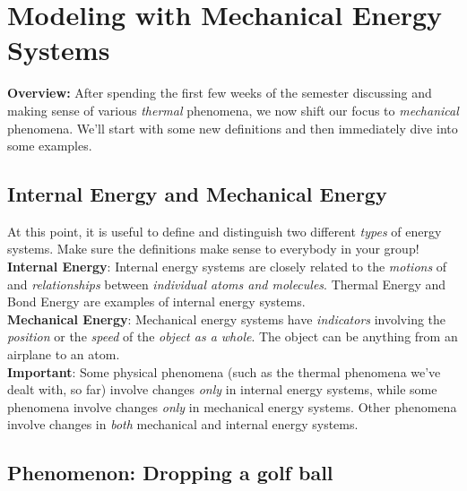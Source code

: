 \section{Modeling with Mechanical Energy Systems}
\label{act2.1.1}

\begin{overview}

\textbf{Overview:} After spending the first few weeks of the semester discussing and making sense of various \emph{thermal} phenomena, we now shift our focus to \emph{mechanical} phenomena. We'll start with some new definitions and then immediately dive into some examples.
	
\end{overview}

\subsection{Internal Energy and Mechanical Energy}

\begin{reading}

\noindent At this point, it is useful to define and distinguish two different \emph{types} of energy systems. Make sure the definitions make sense to everybody in your group!\\

\noindent\textbf{Internal Energy}:  Internal energy systems are closely related to the {\em motions} of and {\em relationships} between {\em individual atoms and molecules}. Thermal Energy and Bond Energy are examples of internal energy systems.\\

\noindent\textbf{Mechanical Energy}: Mechanical energy systems have {\em indicators} involving the {\em position} or the {\em speed} of the {\em object as a whole}.  The object can be anything from an airplane to an atom.\\

\noindent\textbf{Important}: Some physical phenomena (such as the thermal phenomena we've dealt with, so far) involve changes {\em only} in internal energy systems, while some phenomena involve changes \emph{only} in mechanical energy systems. Other phenomena involve changes in \emph{both} mechanical and internal energy systems.
\end{reading}

\WCD 

\subsection{Phenomenon: Dropping a golf ball}

